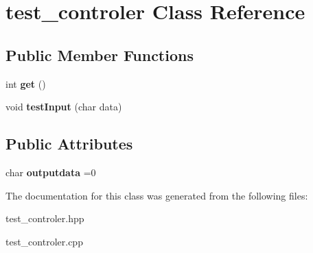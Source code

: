 \hypertarget{classtest__controler}{}\section{test\+\_\+controler Class Reference}
\label{classtest__controler}
\subsection*{Public Member Functions}
\begin{DoxyCompactItemize}
\item 
\mbox{\label{classtest__controler_aee2a44b9508ca2ce0b71ae659b934237}} 
int {\bfseries get} ()
\item 
\mbox{\label{classtest__controler_a010140f0c3d6c41764e768dbf1b68d0f}} 
void {\bfseries test\+Input} (char data)
\end{DoxyCompactItemize}
\subsection*{Public Attributes}
\begin{DoxyCompactItemize}
\item 
\mbox{\label{classtest__controler_ab29d6d9402b1ee96e5a9d30cb1b77e95}} 
char {\bfseries outputdata} =0
\end{DoxyCompactItemize}


The documentation for this class was generated from the following files\+:\begin{DoxyCompactItemize}
\item 
test\+\_\+controler.\+hpp\item 
test\+\_\+controler.\+cpp\end{DoxyCompactItemize}
